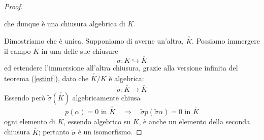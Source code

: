 \begin{multicols}{2}
\begin{proof}
\begin{enumerate}
	\end{enumerate}
che dunque è una chiusura algebrica di $ K $.

Dimostriamo che è unica. Supponiamo di averne un'altra, $\overline{\overline{K}} $. Possiamo immergere il campo $ K $ in una delle sue chiusure
\[ \sigma :  K \hookrightarrow \overline{K} \]
ed estendere l'immersione all'altra chiusura, grazie alla versione infinita del teorema (\ref{estinf}), dato che $ \overline{\overline{K}}/K $ è algebrica:
\[ \tilde{\sigma} : \overline{\overline{K}} \to \overline{K} \]
Essendo però $ \tilde{\sigma}\left(\overline{\overline{K}}\right) $ algebricamente chiusa
\[ p(\alpha) = 0 \text{ in } \overline{\overline{K}} \quad\Rightarrow\quad \tilde{\sigma}p(\tilde{\sigma}\alpha) = 0 \text{ in } {\overline{K}} \]
ogni elemento di $ \overline{K} $, essendo algebrico su $ K $, è anche un elemento della seconda chiusura $ \overline{\overline{K}} $; pertanto $ \tilde{\sigma} $ è un isomorfismo.

\end{proof}
	
	
	
\end{multicols}


